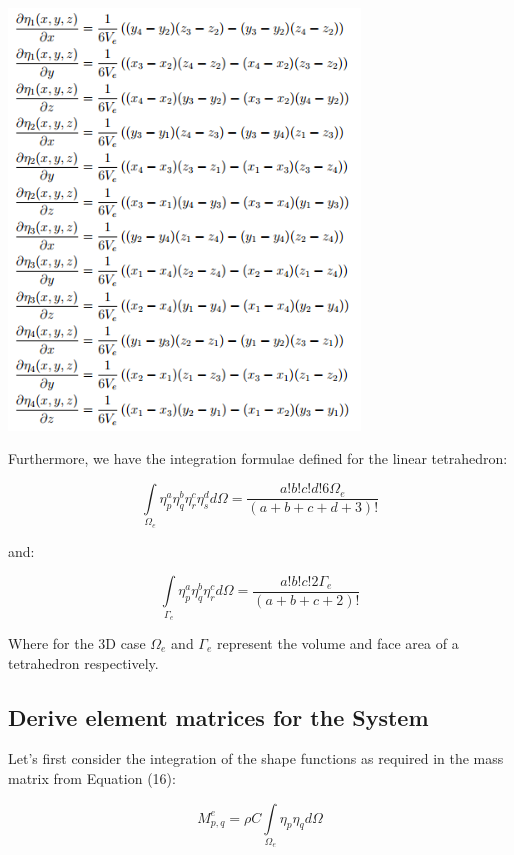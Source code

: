 \documentclass[12pt]{article}
\begin{document}
\begin{center}
  \includegraphics[width=0.7\textwidth]{GradientShapeFunctions}
\end{center}

Furthermore, we have the integration formulae defined for the linear tetrahedron:

\begin{equation}
 \int\limits_{\Omega_e} \eta_p^a \eta_q^b \eta_r^c \eta_s^d d{\Omega}=
 \frac{a!b!c!d!6\Omega_e}{(a+b+c+d+3)!}
\end{equation}

and:

\begin{equation}
 \int\limits_{\Gamma_e} \eta_p^a \eta_q^b \eta_r^c  d{\Omega}=
 \frac{a!b!c!2\Gamma_e}{(a+b+c+2)!}
\end{equation}

Where for the 3D case $\Omega_e$ and $\Gamma_e$ represent the volume and face area of a tetrahedron respectively.

\subsection{Derive element matrices for the System}


Let's first consider the integration of the shape functions as required in the mass matrix from Equation (16):

$$
M_{p,q}^e = \rho C \int\limits_{\Omega_e} \eta_p \eta_q d\Omega
$$
\end{document}
